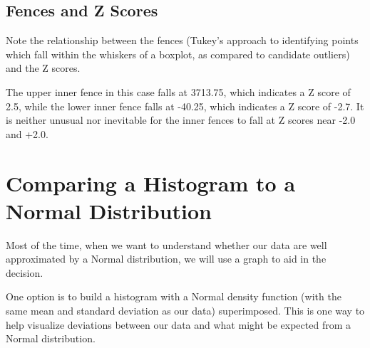 \documentclass[
]{book}
\begin{document}
\hypertarget{fences-and-z-scores}{%
\subsection{Fences and Z Scores}\label{fences-and-z-scores}}

Note the relationship between the fences (Tukey's approach to identifying points which fall within the whiskers of a boxplot, as compared to candidate outliers) and the Z scores.

The upper inner fence in this case falls at 3713.75, which indicates a Z score of 2.5, while the lower inner fence falls at -40.25, which indicates a Z score of -2.7. It is neither unusual nor inevitable for the inner fences to fall at Z scores near -2.0 and +2.0.

\hypertarget{comparing-a-histogram-to-a-normal-distribution}{%
\section{Comparing a Histogram to a Normal Distribution}\label{comparing-a-histogram-to-a-normal-distribution}}

Most of the time, when we want to understand whether our data are well approximated by a Normal distribution, we will use a graph to aid in the decision.

One option is to build a histogram with a Normal density function (with the same mean and standard deviation as our data) superimposed. This is one way to help visualize deviations between our data and what might be expected from a Normal distribution.
\end{document}
